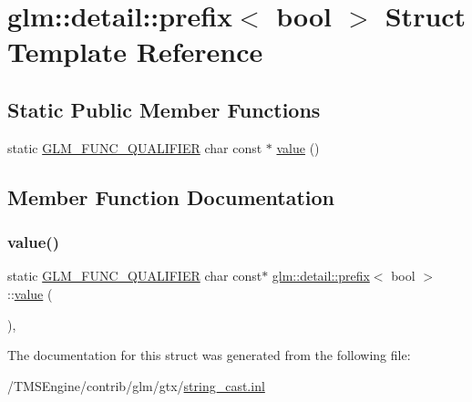 \hypertarget{structglm_1_1detail_1_1prefix_3_01bool_01_4}{}\section{glm\+:\+:detail\+:\+:prefix$<$ bool $>$ Struct Template Reference}
\label{structglm_1_1detail_1_1prefix_3_01bool_01_4}
\subsection*{Static Public Member Functions}
\begin{DoxyCompactItemize}
\item 
static \hyperlink{setup_8hpp_a33fdea6f91c5f834105f7415e2a64407}{G\+L\+M\+\_\+\+F\+U\+N\+C\+\_\+\+Q\+U\+A\+L\+I\+F\+I\+ER} char const  $\ast$ \hyperlink{structglm_1_1detail_1_1prefix_3_01bool_01_4_ab6d6392aa906c684f1abdda98830adad}{value} ()
\end{DoxyCompactItemize}


\subsection{Member Function Documentation}
\mbox{\label{structglm_1_1detail_1_1prefix_3_01bool_01_4_ab6d6392aa906c684f1abdda98830adad}} 
\subsubsection{\texorpdfstring{value()}{value()}}
{\footnotesize\ttfamily static \hyperlink{setup_8hpp_a33fdea6f91c5f834105f7415e2a64407}{G\+L\+M\+\_\+\+F\+U\+N\+C\+\_\+\+Q\+U\+A\+L\+I\+F\+I\+ER} char const$\ast$ \hyperlink{structglm_1_1detail_1_1prefix}{glm\+::detail\+::prefix}$<$ bool $>$\+::\hyperlink{_s_d_l__opengl__glext_8h_a8ad81492d410ff2ac11f754f4042150f}{value} (\begin{DoxyParamCaption}{ }\end{DoxyParamCaption})\hspace{0.3cm}{\ttfamily [inline]}, {\ttfamily [static]}}



The documentation for this struct was generated from the following file\+:\begin{DoxyCompactItemize}
\item 
/\+T\+M\+S\+Engine/contrib/glm/gtx/\hyperlink{string__cast_8inl}{string\+\_\+cast.\+inl}\end{DoxyCompactItemize}

